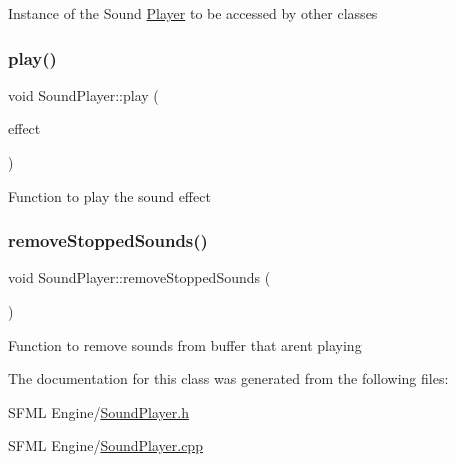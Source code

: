 Instance of the Sound \hyperlink{class_player}{Player} to be accessed by other classes \mbox{\label{class_sound_player_aa0b85f15f5b13bc41c71eeee6b0a7779}} 
\subsubsection{\texorpdfstring{play()}{play()}}
{\footnotesize\ttfamily void Sound\+Player\+::play (\begin{DoxyParamCaption}\item[{\hyperlink{namespace_sound_effect_a11ffbf1eb89e85a34cbfd5a59b2cd9cb}{Sound\+Effect\+::\+ID}}]{effect }\end{DoxyParamCaption})}

Function to play the sound effect \mbox{\label{class_sound_player_a3fd165dadf60b580b16367b81d84681b}} 
\subsubsection{\texorpdfstring{remove\+Stopped\+Sounds()}{removeStoppedSounds()}}
{\footnotesize\ttfamily void Sound\+Player\+::remove\+Stopped\+Sounds (\begin{DoxyParamCaption}{ }\end{DoxyParamCaption})}

Function to remove sounds from buffer that aren\textquotesingle{}t playing 

The documentation for this class was generated from the following files\+:\begin{DoxyCompactItemize}
\item 
S\+F\+M\+L Engine/\hyperlink{_sound_player_8h}{Sound\+Player.\+h}\item 
S\+F\+M\+L Engine/\hyperlink{_sound_player_8cpp}{Sound\+Player.\+cpp}\end{DoxyCompactItemize}
